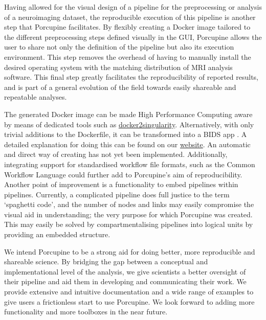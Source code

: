 Having allowed for the visual design of a pipeline for the preprocessing or analysis of a neuroimaging dataset, the reproducible execution of this pipeline is another step that Porcupine facilitates. By flexibly creating a Docker image tailored to the different preprocessing steps defined visually in the GUI, Porcupine allows the user to share not only the definition of the pipeline but also its execution environment. This step removes the overhead of having to manually install the desired operating system with the matching distribution of MRI analysis software. This final step greatly facilitates the reproducibility of reported results, and is part of a general evolution of the field towards easily shareable and repeatable analyses. 

The generated Docker image can be made High Performance Computing aware  by means of dedicated tools such as \href{https://github.com/singularityware/docker2singularity}{docker2singularity}. Alternatively, with only trivial additions to the Dockerfile, it can be transformed into a BIDS app \cite{Gorgolewski2017}. A detailed explanation for doing this can be found on our \href{https://timvanmourik.github.io/Porcupine/documentation/advanced/make-a-bids-app}{website}. An automatic and direct way of creating  has not yet been implemented. Additionally, integrating support for standardised workflow file formats, such as the Common Workflow Language \cite{Amstutz2016} could further add to Porcupine's aim of reproducibility. Another point of improvement is a functionality to embed pipelines within pipelines. Currently, a complicated pipeline does full justice to the term `spaghetti code', and the number of nodes and links may easily compromise the visual aid in understanding; the very purpose for which Porcupine was created. This may easily be solved by compartmentalising pipelines into logical units by providing an embedded structure.

We intend Porcupine to be a strong aid for doing better, more reproducible and shareable science. By bridging the gap between a conceptual and implementational level of the analysis, we give scientists a better oversight of their pipeline and aid them in developing and communicating their work. We provide extensive and intuitive documentation and a wide range of examples to give users a frictionless start to use Porcupine. We look forward to adding more functionality and more toolboxes in the near future.

